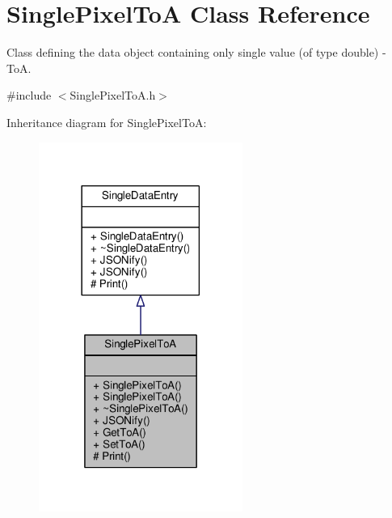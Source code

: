 \hypertarget{classSinglePixelToA}{\section{Single\+Pixel\+To\+A Class Reference}
\label{classSinglePixelToA}
}


Class defining the data object containing only single value (of type double) -\/ To\+A.  




{\ttfamily \#include $<$Single\+Pixel\+To\+A.\+h$>$}



Inheritance diagram for Single\+Pixel\+To\+A\+:
\nopagebreak
\begin{figure}[H]
\begin{center}
\leavevmode
\includegraphics[width=189pt]{classSinglePixelToA__inherit__graph}
\end{center}
\end{figure}


